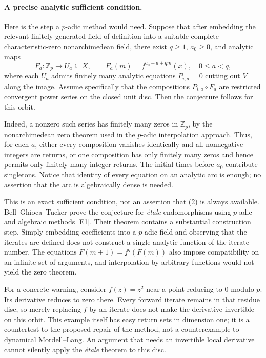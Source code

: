 \documentclass[11pt]{article}
\begin{document}
\paragraph{A precise analytic sufficient condition.}
Here is the step a $p$-adic method would need. Suppose that after embedding the relevant finitely generated field of definition into a suitable complete characteristic-zero nonarchimedean field, there exist $q\ge1$, $a_0\ge0$, and analytic maps
\[
 F_a:\mathbb Z_p\longrightarrow U_a\subseteq X,
 \qquad F_a(m)=f^{a_0+a+qm}(x),\quad 0\le a<q,
                                                               \tag{2}
\]
where each $U_a$ admits finitely many analytic equations $P_{i,a}=0$ cutting out $V$ along the image. Assume specifically that the compositions $P_{i,a}\circ F_a$ are restricted convergent power series on the closed unit disc. Then the conjecture follows for this orbit.

Indeed, a nonzero such series has finitely many zeros in $\mathbb Z_p$, by the nonarchimedean zero theorem used in the $p$-adic interpolation approach. Thus, for each $a$, either every composition vanishes identically and all nonnegative integers are returns, or one composition has only finitely many zeros and hence permits only finitely many integer returns. The initial times before $a_0$ contribute singletons. Notice that identity of every equation on an analytic arc is enough; no assertion that the arc is algebraically dense is needed.

This is an exact sufficient condition, not an assertion that (2) is always available. Bell--Ghioca--Tucker prove the conjecture for \emph{\'etale} endomorphisms using $p$-adic and algebraic methods [E1]. Their theorem contains a substantial construction step. Simply embedding coefficients into a $p$-adic field and observing that the iterates are defined does not construct a single analytic function of the iterate number. The equations $F(m+1)=f^q(F(m))$ also impose compatibility on an infinite set of arguments, and interpolation by arbitrary functions would not yield the zero theorem.

For a concrete warning, consider $f(z)=z^2$ near a point reducing to $0$ modulo $p$. Its derivative reduces to zero there. Every forward iterate remains in that residue disc, so merely replacing $f$ by an iterate does not make the derivative invertible on this orbit. This example itself has easy return sets in dimension one; it is a countertest to the proposed repair of the method, not a counterexample to dynamical Mordell--Lang. An argument that needs an invertible local derivative cannot silently apply the \emph{\'etale} theorem to this disc.
\end{document}

